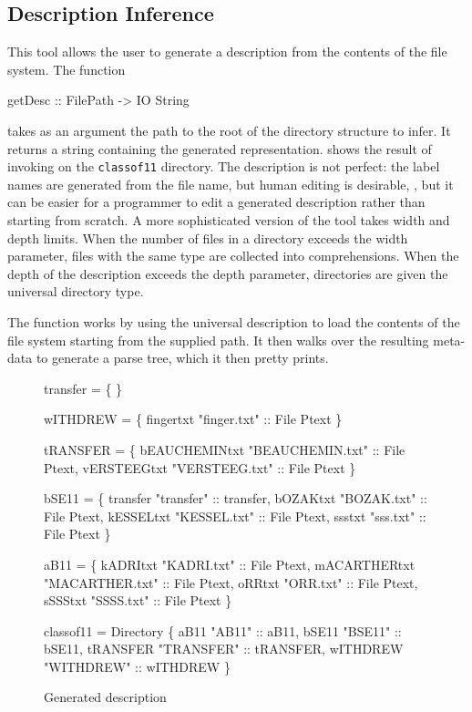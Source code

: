\subsection{Description Inference}
This tool allows the user to generate a \forest{} description from the
contents of the file system.   The function
\begin{code}
getDesc :: FilePath -> IO String
\end{code}
takes as an argument the path to the root of the directory structure
to infer.  It returns a string containing the generated
representation.   shows the result
of invoking  on the \texttt{classof11} directory.  
The description is not perfect: the label names are generated 
from the file name, but human editing is desirable, \etc, but it can
be easier for a programmer to edit a generated description rather than
starting from scratch.  A more sophisticated version of the tool 
takes width and depth limits. When the number of files in a directory
exceeds the width parameter, files with the same type are collected into
comprehensions.  When the depth of the description exceeds the depth
parameter, directories are given the universal directory type.

The  function works by using the universal description to
load the contents of the file system starting from the supplied path.
It then walks over the resulting meta-data to generate a \forest{}
parse tree, which it then pretty prints.


\begin{figure}
\begin{code}
 transfer =  \{
\}

 wITHDREW =  \{
    fingertxt  "finger.txt" :: File Ptext
\}

 tRANSFER =  \{
    bEAUCHEMINtxt  "BEAUCHEMIN.txt" :: File Ptext,
    vERSTEEGtxt  "VERSTEEG.txt" :: File Ptext
\}

 bSE11 =  \{
    transfer  "transfer" :: transfer,
    bOZAKtxt  "BOZAK.txt" :: File Ptext,
    kESSELtxt  "KESSEL.txt" :: File Ptext,
    ssstxt  "sss.txt" :: File Ptext
\}

 aB11 =  \{
    kADRItxt  "KADRI.txt" :: File Ptext,
    mACARTHERtxt  "MACARTHER.txt" :: File Ptext,
    oRRtxt  "ORR.txt" :: File Ptext,
    sSSStxt  "SSSS.txt" :: File Ptext
\}

 classof11 = Directory \{
    aB11  "AB11" :: aB11,
    bSE11  "BSE11" :: bSE11,
    tRANSFER  "TRANSFER" :: tRANSFER,
    wITHDREW  "WITHDREW" :: wITHDREW
\}
\end{code}
\caption{Generated description}
\label{fig:generated-description}
\end{figure}

